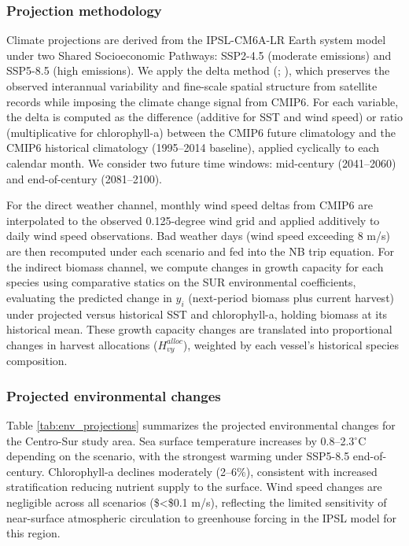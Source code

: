 \documentclass[
  11pt,
]{article}
\begin{document}
\subsubsection{Projection methodology}\label{projection-methodology}

Climate projections are derived from the IPSL-CM6A-LR Earth system model under two Shared Socioeconomic Pathways: SSP2-4.5 (moderate emissions) and SSP5-8.5 (high emissions). We apply the delta method (; ), which preserves the observed interannual variability and fine-scale spatial structure from satellite records while imposing the climate change signal from CMIP6. For each variable, the delta is computed as the difference (additive for SST and wind speed) or ratio (multiplicative for chlorophyll-a) between the CMIP6 future climatology and the CMIP6 historical climatology (1995--2014 baseline), applied cyclically to each calendar month. We consider two future time windows: mid-century (2041--2060) and end-of-century (2081--2100).

For the direct weather channel, monthly wind speed deltas from CMIP6 are interpolated to the observed 0.125-degree wind grid and applied additively to daily wind speed observations. Bad weather days (wind speed exceeding 8 m/s) are then recomputed under each scenario and fed into the NB trip equation. For the indirect biomass channel, we compute changes in growth capacity for each species using comparative statics on the SUR environmental coefficients, evaluating the predicted change in \(y_i\) (next-period biomass plus current harvest) under projected versus historical SST and chlorophyll-a, holding biomass at its historical mean. These growth capacity changes are translated into proportional changes in harvest allocations (\(H^{alloc}_{vy}\)), weighted by each vessel's historical species composition.

\subsubsection{Projected environmental changes}\label{projected-environmental-changes}

Table \ref{tab:env_projections} summarizes the projected environmental changes for the Centro-Sur study area. Sea surface temperature increases by 0.8--2.3\(^\circ\)C depending on the scenario, with the strongest warming under SSP5-8.5 end-of-century. Chlorophyll-a declines moderately (2--6\%), consistent with increased stratification reducing nutrient supply to the surface. Wind speed changes are negligible across all scenarios (\$\textless\$0.1 m/s), reflecting the limited sensitivity of near-surface atmospheric circulation to greenhouse forcing in the IPSL model for this region.
\end{document}
